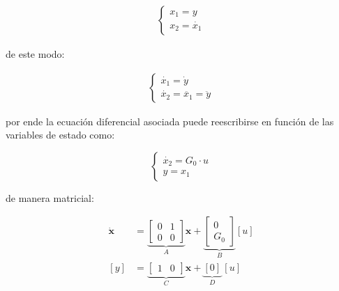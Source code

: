 \begin{align*}
\begin{cases}
    x_1 = y\\
    x_2 = \dot{x_1}
\end{cases}
\end{align*}

\noindent de este modo:

\begin{align*}
\begin{cases}
    \dot{x_1} = \dot{y}\\
    \dot{x_2} = \ddot{x_1} = \ddot{y}
\end{cases}
\end{align*}

\noindent por ende la ecuación diferencial asociada puede reescribirse en función de las variables de estado como:

\begin{equation}
\begin{cases}
    \dot{x_2} = G_0 \cdot u\\
    y = x_1
\end{cases}
\end{equation}

\noindent de manera matricial: 


\begin{equation}
\begin{aligned}
\dot{\mathbf{x}} &=
\underbrace{
\begin{bmatrix}
0 & 1 \\
0 & 0
\end{bmatrix}
}_{A}
\mathbf{x}
+
\underbrace{
\begin{bmatrix}
0 \\
G_0
\end{bmatrix}
}_{B}
[u] \\
[y] &=
\underbrace{
\begin{bmatrix}
1 & 0
\end{bmatrix}
}_{C}
\mathbf{x}
+
\underbrace{[0]}_{D} \, [u]
\end{aligned}
\end{equation}